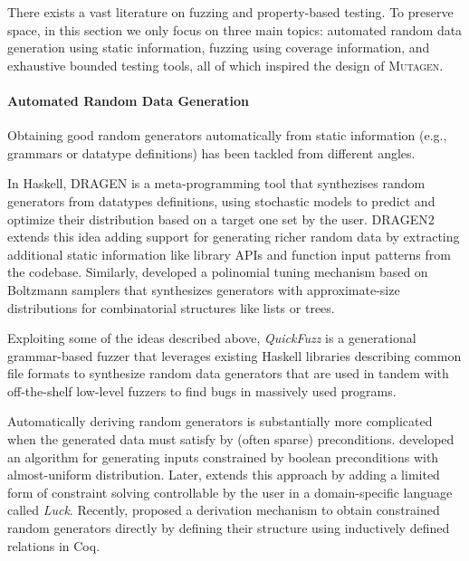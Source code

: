 \documentclass[acmsmall, anonymous]{acmart}
\newcommand{\mutagen}{\textsc{Mutagen}\xspace}
\begin{document}
There exists a vast literature on fuzzing and property-based testing.
%
To preserve space, in this section we only focus on three main topics:
%
automated random data generation using static information,
%
fuzzing using coverage information, and
%
exhaustive bounded testing tools, all of which inspired the design of \mutagen.


\paragraph{Automated Random Data Generation}

Obtaining good random generators automatically from static information (e.g.,
grammars or datatype definitions) has been tackled from different angles.

In Haskell, DRAGEN \cite{dragen} is a meta-programming tool that synthezises
random generators from datatypes definitions, using stochastic models to predict
and optimize their distribution based on a target one set by the user.
%
DRAGEN2 \cite{dragen2} extends this idea adding support for generating richer
random data by extracting additional static information like library APIs and
function input patterns from the codebase.
%
Similarly, \cite{bendkowski} developed a polinomial tuning mechanism based on
Boltzmann samplers \cite{boltzmann} that synthesizes generators with
approximate-size distributions for combinatorial structures like lists or trees.

%
%
Exploiting some of the ideas described above, \emph{QuickFuzz} \cite{quickfuzz,
  quickfuzzjournal} is a generational grammar-based fuzzer that leverages
existing Haskell libraries describing common file formats to synthesize random
data generators that are used in tandem with off-the-shelf low-level fuzzers to
find bugs in massively used programs.



Automatically deriving random generators is substantially more complicated when
the generated data must satisfy by (often sparse) preconditions.
%
%
\cite{claessen2014} developed an algorithm for generating inputs constrained by
boolean preconditions with almost-uniform distribution.
%
%
Later, \cite{luck} extends this approach by adding a limited form of constraint
solving controllable by the user in a domain-specific language called
\emph{Luck}.
%
%
Recently, \cite{generatinggood} proposed a derivation mechanism to obtain
constrained random generators directly by defining their structure
using inductively defined relations in Coq.
\end{document}
